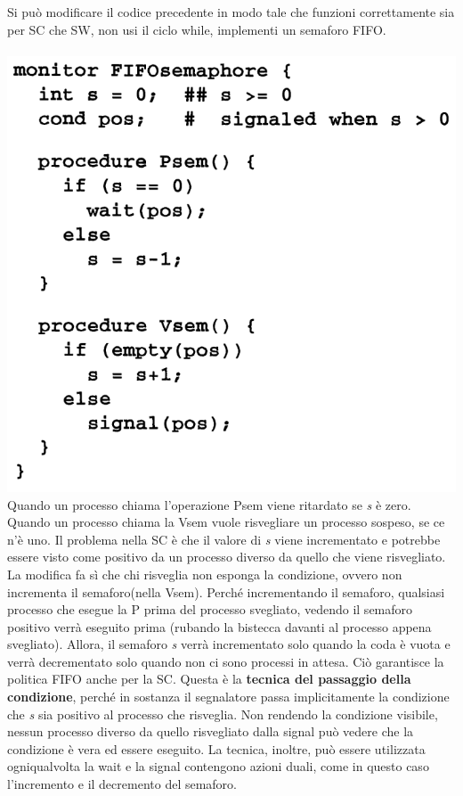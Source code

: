 \documentclass[10pt,a4paper]{book}
\begin{document}
Si può modificare il codice precedente in modo tale che funzioni correttamente sia per SC che SW, non usi il ciclo while, implementi un semaforo FIFO.\\ \\\includegraphics[scale=0.31]{img/semfifo.png} \\
Quando un processo chiama l'operazione Psem viene ritardato se \textit{s} è zero. Quando un processo chiama la Vsem vuole risvegliare un processo sospeso, se ce n'è uno. Il problema nella SC è che il valore di \textit{s} viene incrementato e potrebbe essere visto come positivo da un processo diverso da quello che viene risvegliato.
La modifica fa sì che chi risveglia non esponga la condizione, ovvero non incrementa il semaforo(nella Vsem). Perché incrementando il semaforo, qualsiasi processo che esegue la P prima del processo svegliato, vedendo il semaforo positivo verrà eseguito prima (rubando la bistecca davanti al processo appena svegliato). Allora, il semaforo \textit{s} verrà incrementato solo quando la coda è vuota e verrà decrementato solo quando non ci sono processi in attesa.
Ciò garantisce la politica FIFO anche per la SC.
Questa è la \textbf{tecnica del passaggio della condizione}, perché in sostanza il segnalatore passa implicitamente la condizione che \textit{s} sia positivo al processo che risveglia. Non rendendo la condizione visibile, nessun processo diverso da quello risvegliato dalla signal può vedere che la condizione è vera ed essere eseguito. La tecnica, inoltre, può essere utilizzata ogniqualvolta la wait e la signal contengono azioni duali, come in questo caso l'incremento e il decremento del semaforo.\\ \\
\end{document}
